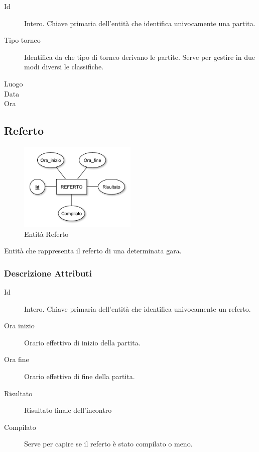 		\begin{description}
			
			\item[Id]
			Intero. Chiave primaria dell'entità che identifica univocamente una partita.
			
			\item[Tipo torneo]
			Identifica da che tipo di torneo derivano le partite. Serve per gestire in due modi diversi le classifiche.
			
			\item[Luogo]
			
			
			\item[Data]
			
			
			\item[Ora]
			
			
		\end{description}
	
	\subsection{Referto}
		
		\begin{figure}[h]
			\centering
			\includegraphics[width=0.5\textwidth]
			{immagini/08-referto}
			
			\caption{Entità Referto}
		\end{figure}
		
		Entità che rappresenta il referto di una determinata gara.
		
		\subsubsection*{Descrizione Attributi}
		
		\begin{description}
			
			\item[Id]
			Intero. Chiave primaria dell'entità che identifica univocamente un referto.
			
			\item[Ora inizio]
			Orario effettivo di inizio della partita.
			
			\item[Ora fine]
			Orario effettivo di fine della partita.
			
			\item[Risultato]
			Risultato finale dell'incontro
			
			\item[Compilato]
			Serve per capire se il referto è stato compilato o meno.
			
		\end{description}
	
